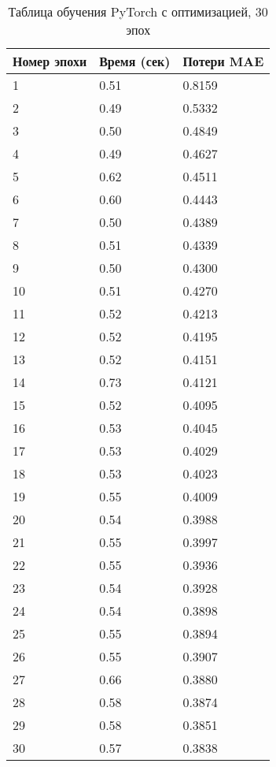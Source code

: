 \documentclass[a4paper,12pt,titlepage,final]{article}
\begin{document}
\begin{table}[H]
\centering
\begin{tabular}{|p{6.4cm}|p{3.2cm}|p{3.2cm}|}
\hline
Номер эпохи & Время (сек) & Потери MAE\\
\hline
1 & 0.51 & 0.8159 \\ [1.5ex]
\hline
2 & 0.49 & 0.5332 \\ [1.5ex]
\hline
3 & 0.50 & 0.4849 \\ [1.5ex]
\hline
4 & 0.49 & 0.4627 \\ [1.5ex]
\hline
5 & 0.62 & 0.4511 \\ [1.5ex]
\hline
6 & 0.60 & 0.4443 \\ [1.5ex]
\hline
7 & 0.50 & 0.4389 \\ [1.5ex]
\hline
8 & 0.51 & 0.4339 \\ [1.5ex]
\hline
9 & 0.50 & 0.4300 \\ [1.5ex]
\hline
10 & 0.51 & 0.4270 \\ [1.5ex]
\hline
11 & 0.52 & 0.4213 \\ [1.5ex]
\hline
12 & 0.52 & 0.4195 \\ [1.5ex]
\hline
13 & 0.52 & 0.4151 \\ [1.5ex]
\hline
14 & 0.73 & 0.4121 \\ [1.5ex]
\hline
15 & 0.52 & 0.4095 \\ [1.5ex]
\hline
16 & 0.53 & 0.4045 \\ [1.5ex]
\hline
17 & 0.53 & 0.4029 \\ [1.5ex]
\hline
18 & 0.53 & 0.4023 \\ [1.5ex]
\hline
19 & 0.55 & 0.4009 \\ [1.5ex]
\hline
20 & 0.54 & 0.3988 \\ [1.5ex]
\hline
21 & 0.55 & 0.3997 \\ [1.5ex]
\hline
22 & 0.55 & 0.3936 \\ [1.5ex]
\hline
23 & 0.54 & 0.3928 \\ [1.5ex]
\hline
24 & 0.54 & 0.3898 \\ [1.5ex]
\hline
25 & 0.55 & 0.3894 \\ [1.5ex]
\hline
26 & 0.55 & 0.3907 \\ [1.5ex]
\hline
27 & 0.66 & 0.3880 \\ [1.5ex]
\hline
28 & 0.58 & 0.3874 \\ [1.5ex]
\hline
29 & 0.58 & 0.3851 \\ [1.5ex]
\hline
30 & 0.57 & 0.3838 \\ [1.5ex]
\hline
\end{tabular}
\caption{Таблица обучения PyTorch с оптимизацией, 30 эпох}
\label{table12}
\end{table}
\end{document}

